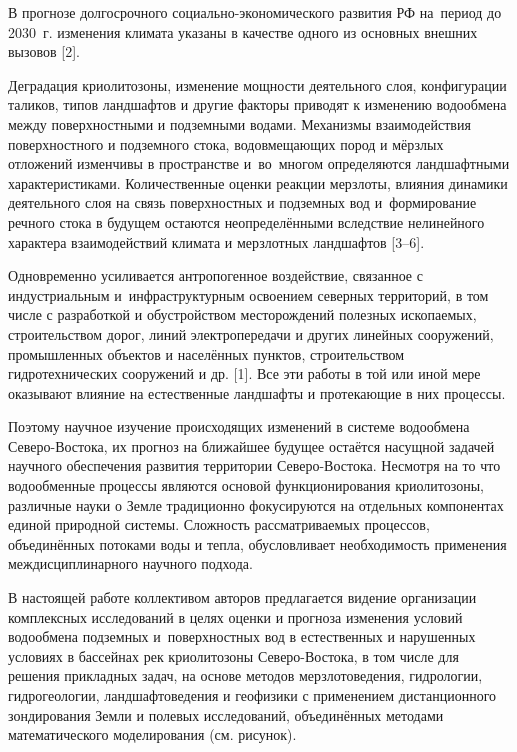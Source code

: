  

\makeProcTitle
{}

В прогнозе долгосрочного социально-экономического развития РФ на~период до 2030~г. изменения климата указаны в качестве одного из основных внешних вызовов [2].

Деградация криолитозоны, изменение мощности деятельного слоя, конфигурации таликов, типов ландшафтов и другие факторы приводят к изменению водообмена между поверхностными и подземными водами. Механизмы взаимодействия поверхностного и подземного стока, водовмещающих пород и мёрзлых отложений изменчивы в пространстве и~во~многом определяются ландшафтными характеристиками. Количественные оценки реакции мерзлоты, влияния динамики деятельного слоя на связь поверхностных и подземных вод и~формирование речного стока в будущем остаются неопределёнными вследствие нелинейного характера взаимодействий климата и мерзлотных ландшафтов [3--6].

Одновременно усиливается антропогенное воздействие, связанное с индустриальным и~инфраструктурным освоением северных территорий, в том числе с разработкой и обустройством месторождений полезных ископаемых, строительством дорог, линий электропередачи и других линейных сооружений, промышленных объектов и населённых пунктов, строительством гидротехнических сооружений и др. [1]. Все эти работы в той или иной мере оказывают влияние на естественные ландшафты и протекающие в них процессы.

Поэтому научное изучение происходящих изменений в системе водообмена Северо-Востока, их прогноз на ближайшее будущее остаётся насущной задачей научного обеспечения развития территории Северо-Востока. Несмотря на то что водообменные процессы являются основой функционирования криолитозоны, различные науки о Земле традиционно фокусируются на отдельных компонентах единой природной системы. Сложность рассматриваемых процессов, объединённых потоками воды и тепла, обусловливает необходимость применения междисциплинарного научного подхода.

В настоящей работе коллективом авторов предлагается видение организации комплексных исследований в целях оценки и прогноза изменения условий водообмена подземных и~поверхностных вод в естественных и нарушенных условиях в бассейнах рек криолитозоны Северо-Востока, в том числе для решения прикладных задач, на основе методов мерзлотоведения, гидрологии, гидрогеологии, ландшафтоведения и геофизики с применением дистанционного зондирования Земли и полевых исследований, объединённых методами математического моделирования (см. рисунок).

